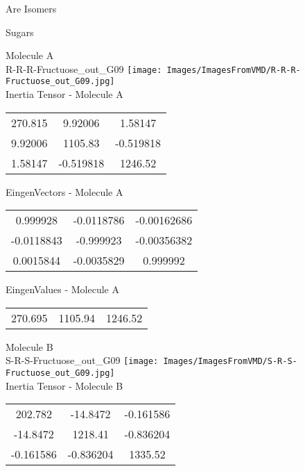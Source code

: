 \begin{center}
\vtab
\vtab
\textcolor{NavyBlue}{\Large Are Isomers}
\end{center}
\newpage

\vtab[-2cm]
\begin{center}
{\large Sugars}
\end{center}
\begin{multicols}{2}
\begin{center}
Molecule A \\ 
R-R-R-Fructuose\_out\_G09
\texttt{[image: Images/ImagesFromVMD/R-R-R-Fructuose\_out\_G09.jpg]}
\\
Inertia Tensor - Molecule A \\
\vtab
\begin{tabular}{|c c c|}
270.815	 & 	9.92006	 & 	1.58147	 \\
9.92006	 & 	1105.83	 & 	-0.519818	 \\
1.58147	 & 	-0.519818	 & 	1246.52
\end{tabular}

\vtab
 EingenVectors - Molecule A     \\
\vtab
\begin{tabular}{|c c c|}
0.999928	 & 	-0.0118786	 & 	-0.00162686	 \\
-0.0118843	 & 	-0.999923	 & 	-0.00356382	 \\
0.0015844	 & 	-0.0035829	 & 	0.999992
\end{tabular}

\vtab
 EingenValues - Molecule A     \\
\vtab
\begin{tabular}{|c c c|}
270.695	 & 	1105.94	 & 	1246.52
\end{tabular}
\columnbreak

Molecule B \\ 
S-R-S-Fructuose\_out\_G09
\texttt{[image: Images/ImagesFromVMD/S-R-S-Fructuose\_out\_G09.jpg]}
\\
Inertia Tensor - Molecule B \\
\vtab
\begin{tabular}{|c c c|}
202.782	 & 	-14.8472	 & 	-0.161586	 \\
-14.8472	 & 	1218.41	 & 	-0.836204	 \\
-0.161586	 & 	-0.836204	 & 	1335.52
\end{tabular}


\end{center}
\end{multicols}
